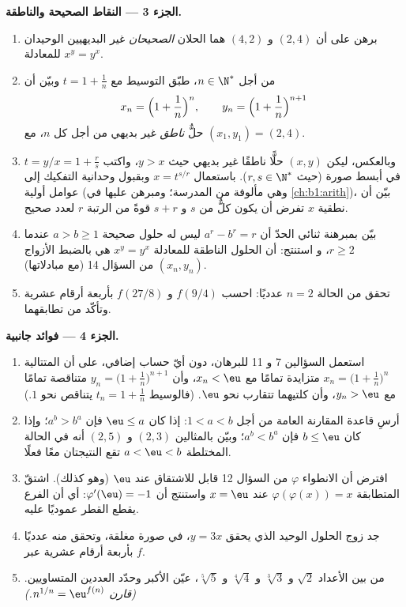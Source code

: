\begin{problem}
\medskip
\noindent\textbf{الجزء 3 --- النقاط الصحيحة والناطقة.}
\begin{enumerate}[resume]
  \item برهن على أن $(2, 4)$ و $(4, 2)$ هما الحلان
        \emph{الصحيحان} غير البديهيين الوحيدان للمعادلة $x^y = y^x$.
  \item من أجل $n \in \N^*$، طبّق التوسيط مع $t = 1 +
        \frac1n$ وبيّن أن
        \[
        x_n = \Bigl(1 + \frac1n\Bigr)^{n},
        \qquad
        y_n = \Bigl(1 + \frac1n\Bigr)^{n+1}
        \]
        حلٌّ \emph{ناطق} غير بديهي من أجل كل $n$،
        مع $(x_1, y_1) = (2, 4)$.
  \item وبالعكس، ليكن $(x, y)$ حلًّا ناطقًا غير بديهي
        حيث $y > x$، واكتب $t = y/x = 1 + \frac rs$ في أبسط
        صورة (حيث $r, s \in \N^*$). باستعمال $x = t^{s/r}$ وبقبول
        وحدانية التفكيك إلى عوامل أولية (وهي مألوفة من
        المدرسة؛ ومبرهن عليها في \cref{ch:b1:arith})، بيّن أن نطقية $x$
        تفرض أن يكون كلٌّ من $s$ و $s + r$ قوةً من الرتبة $r$
        لعدد صحيح.
  \item بيّن بمبرهنة ثنائي الحدّ أن $a^r - b^r = r$ ليس له
        حلول صحيحة $a > b \geq 1$ عندما $r \geq 2$، و
        استنتج: أن الحلول الناطقة للمعادلة $x^y = y^x$ هي
        بالضبط الأزواج $(x_n, y_n)$ من السؤال 14 (مع
        مبادلاتها).
  \item تحقق من الحالة $n = 2$ عدديًا: احسب $f(9/4)$ و
        $f(27/8)$ بأربعة أرقام عشرية وتأكّد من تطابقهما.
\end{enumerate}

\medskip
\noindent\textbf{الجزء 4 --- فوائد جانبية.}
\begin{enumerate}[resume]
  \item استعمل السؤالين 7 و 11 للبرهان، دون أيّ حساب
        إضافي، على أن المتتالية $x_n = \bigl(1 +
        \frac1n\bigr)^n$ متزايدة تمامًا مع $x_n < \eu$،
        وأن $y_n = \bigl(1 + \frac1n\bigr)^{n+1}$ متناقصة
        تمامًا مع $y_n > \eu$، وأن كلتيهما تتقارب نحو
        $\eu$. (فالوسيط $t_n = 1 + \frac1n$ يتناقص نحو
        $1$.)
  \item أرسِ قاعدة المقارنة العامة من أجل $1 < a < b$:
        إذا كان $\eu \leq a$ فإن $a^b > b^a$؛ وإذا كان $b \leq \eu$ فإن
        $a^b < b^a$؛ وبيّن بالمثالين $(2, 3)$ و
        $(2, 5)$ أنه في الحالة المختلطة $a < \eu < b$ تقع
        النتيجتان معًا فعلًا.
  \item افترض أن الانطواء $\varphi$ من السؤال 12 قابل
        للاشتقاق عند $\eu$ (وهو كذلك). اشتقّ
        المتطابقة $\varphi(\varphi(x)) = x$ عند $x = \eu$ واستنتج أن
        $\varphi'(\eu) = -1$: أي أن الفرع يقطع القطر
        عموديًا عليه.
  \item جد زوج الحلول الوحيد الذي يحقق $y = 3x$، في صورة
        مغلقة، وتحقق منه عدديًا بأربعة أرقام عشرية عبر $f$.
  \item من بين الأعداد $\sqrt2$ و $\sqrt[3]3$ و $\sqrt[4]4$ و
        $\sqrt[5]5$، عيّن الأكبر وحدّد العددين
        المتساويين. \emph{(قارن $n^{1/n} =
        \eu^{f(n)}$.)}
\end{enumerate}


\end{problem}
